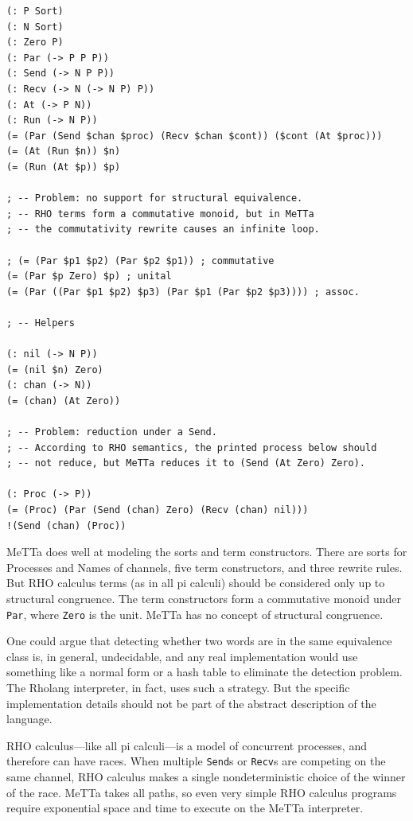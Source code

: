 \documentclass{article}
\begin{document}
\begin{verbatim}
(: P Sort)
(: N Sort)
(: Zero P)
(: Par (-> P P P))
(: Send (-> N P P))
(: Recv (-> N (-> N P) P))
(: At (-> P N))
(: Run (-> N P))
(= (Par (Send $chan $proc) (Recv $chan $cont)) ($cont (At $proc)))
(= (At (Run $n)) $n)
(= (Run (At $p)) $p)

; -- Problem: no support for structural equivalence.
; -- RHO terms form a commutative monoid, but in MeTTa
; -- the commutativity rewrite causes an infinite loop.

; (= (Par $p1 $p2) (Par $p2 $p1)) ; commutative
(= (Par $p Zero) $p) ; unital
(= (Par ((Par $p1 $p2) $p3) (Par $p1 (Par $p2 $p3)))) ; assoc.

; -- Helpers

(: nil (-> N P))
(= (nil $n) Zero)
(: chan (-> N))
(= (chan) (At Zero))

; -- Problem: reduction under a Send.
; -- According to RHO semantics, the printed process below should
; -- not reduce, but MeTTa reduces it to (Send (At Zero) Zero).

(: Proc (-> P))
(= (Proc) (Par (Send (chan) Zero) (Recv (chan) nil)))
!(Send (chan) (Proc))
\end{verbatim}

\noindent MeTTa does well at modeling the sorts and term constructors.  There are sorts for Processes and Names of channels, five term constructors, and three rewrite rules.  But RHO calculus terms (as in all pi calculi) should be considered only up to structural congruence.  The term constructors form a commutative monoid under \verb+Par+, where \verb+Zero+ is the unit.  MeTTa has no concept of structural congruence.

One could argue that detecting whether two words are in the same equivalence class is, in general, undecidable, and any real implementation would use something like a normal form or a hash table to eliminate the detection problem.  The Rholang interpreter, in fact, uses such a strategy.  But the specific implementation details should not be part of the abstract description of the language.

RHO calculus---like all pi calculi---is a model of concurrent processes, and therefore can have races.  When multiple \verb+Send+s or \verb+Recv+s are competing on the same channel, RHO calculus makes a single nondeterministic choice of the winner of the race.  MeTTa takes all paths, so even very simple RHO calculus programs require exponential space and time to execute on the MeTTa interpreter.
\end{document}
